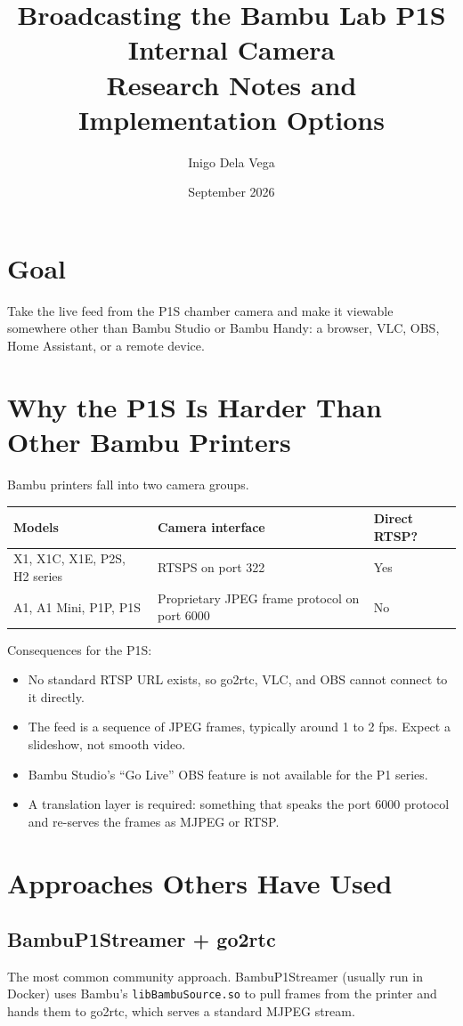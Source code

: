 \documentclass[11pt]{article}
\title{Broadcasting the Bambu Lab P1S Internal Camera\\\large Research Notes and Implementation Options}
\author{Inigo Dela Vega}
\date{September 2026}
\begin{document}
\maketitle

\section{Goal}
Take the live feed from the P1S chamber camera and make it viewable somewhere other than
Bambu Studio or Bambu Handy: a browser, VLC, OBS, Home Assistant, or a remote device.

\section{Why the P1S Is Harder Than Other Bambu Printers}
Bambu printers fall into two camera groups.

\begin{center}
\begin{tabularx}{\linewidth}{@{}lXl@{}}
\hline
\textbf{Models} & \textbf{Camera interface} & \textbf{Direct RTSP?} \\
\hline
X1, X1C, X1E, P2S, H2 series & RTSPS on port 322 & Yes \\
A1, A1 Mini, P1P, P1S & Proprietary JPEG frame protocol on port 6000 & No \\
\hline
\end{tabularx}
\end{center}

Consequences for the P1S:
\begin{itemize}[itemsep=2pt]
  \item No standard RTSP URL exists, so go2rtc, VLC, and OBS cannot connect to it directly.
  \item The feed is a sequence of JPEG frames, typically around 1 to 2 fps. Expect a slideshow, not smooth video.
  \item Bambu Studio's ``Go Live'' OBS feature is not available for the P1 series.
  \item A translation layer is required: something that speaks the port 6000 protocol and re-serves the frames as MJPEG or RTSP.
\end{itemize}

\section{Approaches Others Have Used}

\subsection{BambuP1Streamer + go2rtc}
The most common community approach. BambuP1Streamer (usually run in Docker) uses Bambu's
\texttt{libBambuSource.so} to pull frames from the printer and hands them to go2rtc, which
serves a standard MJPEG stream.
\end{document}

